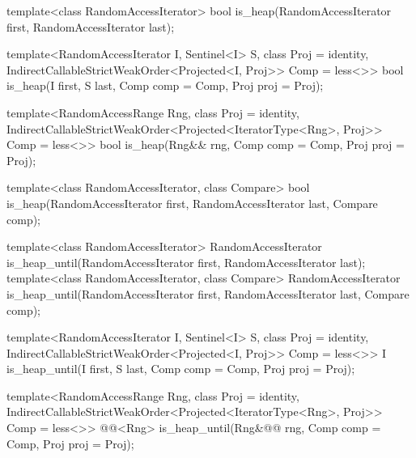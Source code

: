 %
\begin{removedblock}
\begin{itemdecl}
  template<class RandomAccessIterator>
    bool is_heap(RandomAccessIterator first, RandomAccessIterator last);
\end{itemdecl}
\end{removedblock}
\begin{addedblock}
\begin{itemdecl}
template<RandomAccessIterator I, Sentinel<I> S, class Proj = identity,
    IndirectCallableStrictWeakOrder<Projected<I, Proj>> Comp = less<>>
  bool is_heap(I first, S last, Comp comp = Comp{}, Proj proj = Proj{});

template<RandomAccessRange Rng, class Proj = identity,
    IndirectCallableStrictWeakOrder<Projected<IteratorType<Rng>, Proj>> Comp = less<>>
  bool
    is_heap(Rng&& rng, Comp comp = Comp{}, Proj proj = Proj{});
\end{itemdecl}
\end{addedblock}

\begin{itemdescr}
\pnum
\returns {}
\end{itemdescr}

\begin{removedblock}
%
\begin{itemdecl}
  template<class RandomAccessIterator, class Compare>
    bool is_heap(RandomAccessIterator first, RandomAccessIterator last, Compare comp);
\end{itemdecl}

\begin{itemdescr}
\pnum
\returns {}
\end{itemdescr}
\end{removedblock}

%
\begin{removedblock}
\begin{itemdecl}
  template<class RandomAccessIterator>
    RandomAccessIterator is_heap_until(RandomAccessIterator first, RandomAccessIterator last);
  template<class RandomAccessIterator, class Compare>
    RandomAccessIterator is_heap_until(RandomAccessIterator first, RandomAccessIterator last,
      Compare comp);
\end{itemdecl}
\end{removedblock}
\begin{addedblock}
\begin{itemdecl}
template<RandomAccessIterator I, Sentinel<I> S, class Proj = identity,
    IndirectCallableStrictWeakOrder<Projected<I, Proj>> Comp = less<>>
  I is_heap_until(I first, S last, Comp comp = Comp{}, Proj proj = Proj{});

template<RandomAccessRange Rng, class Proj = identity,
    IndirectCallableStrictWeakOrder<Projected<IteratorType<Rng>, Proj>> Comp = less<>>
  @@<Rng>
    is_heap_until(Rng&@\newtxt{\&}@ rng, Comp comp = Comp{}, Proj proj = Proj{});
\end{itemdecl}
\end{addedblock}


